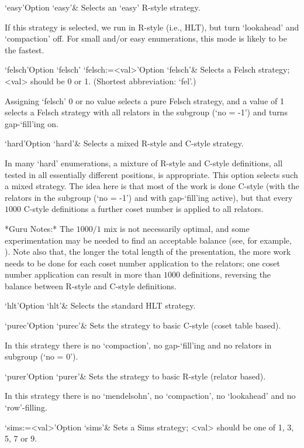 \>`easy'{Option `easy'}&
Selects an \lq{}easy' R-style strategy.

If this strategy is selected, we run in R-style (i.e., HLT), but  turn
`lookahead' and `compaction' off. For small and/or easy  enumerations,
this mode is likely to be the fastest.

\>`felsch'{Option `felsch'}
\>`felsch:=<val>'{Option `felsch'}&
Selects a Felsch strategy; <val> should be 0 or 1. 
(Shortest abbreviation: `fel'.)

Assigning `felsch' 0 or no value selects a pure Felsch strategy, and a
value of 1 selects a Felsch strategy with all relators in the subgroup
(`no = -1') and turns gap-`fill'ing on.

\>`hard'{Option `hard'}&  
Selects a mixed R-style and C-style strategy.

In many \lq{}hard' enumerations, a  mixture  of  R-style  and  C-style
definitions, all tested in all  essentially  different  positions,  is
appropriate. This option selects such a mixed strategy. The idea  here
is that most of the work is done C-style (with  the  relators  in  the
subgroup (`no = -1') and with gap-`fill'ing active),  but  that  every
$1000$ C-style definitions a further coset number is  applied  to  all
relators.

*Guru  Notes:*
The $1000/1$ mix is not necessarily optimal, and some  experimentation
may be needed  to  find  an  acceptable  balance  (see,  for  example,
\cite{HR99b}). Note also that, the longer  the  total  length  of  the
presentation, the more work needs to be done  for  each  coset  number
application to the relators; one coset number application  can  result
in more than $1000$ definitions, reversing the balance between R-style
and C-style definitions.

\>`hlt'{Option `hlt'}&
Selects the standard HLT strategy.

\>`purec'{Option `purec'}&
Sets the strategy to basic C-style (coset table based).

In this strategy there is no `compaction',  no  gap-`fill'ing  and  no
relators in subgroup (`no = 0').

\>`purer'{Option `purer'}&
Sets the strategy  to basic R-style (relator based).

In this  strategy  there  is  no  `mendelsohn',  no  `compaction',  no
`lookahead' and no `row'-filling.

\>`sims:=<val>'{Option `sims'}&
Sets a Sims strategy; <val> should be one of 1, 3, 5, 7 or 9.

